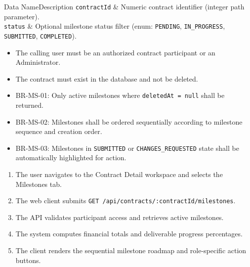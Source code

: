 
\begin{specdatatable}{Data Name}{Description}
      \texttt{contractId} & Numeric contract identifier (integer path parameter).\\ \hline
      \texttt{status} & Optional milestone status filter (enum: \texttt{PENDING}, \texttt{IN\_PROGRESS}, \texttt{SUBMITTED}, \texttt{COMPLETED}).\\ \hline
\end{specdatatable}

\begin{itemize}[leftmargin=1.6em,topsep=3pt,itemsep=2pt,parsep=0pt,label=$\bullet$]
      \item The calling user must be an authorized contract participant or an Administrator.
      \item The contract must exist in the database and not be deleted.
\end{itemize}

\begin{itemize}[leftmargin=1.6em,topsep=3pt,itemsep=2pt,parsep=0pt,label=$\bullet$]\brrulelist
      \item BR-MS-01: Only active milestones where \texttt{deletedAt = null} shall be returned.
      \item BR-MS-02: Milestones shall be ordered sequentially according to milestone sequence and creation order.
      \item BR-MS-03: Milestones in \texttt{SUBMITTED} or \texttt{CHANGES\_REQUESTED} state shall be automatically highlighted for action.
\end{itemize}

\begin{enumerate}[leftmargin=1.8em,topsep=3pt,itemsep=2pt,parsep=0pt]
      \item The user navigates to the Contract Detail workspace and selects the Milestones tab.
      \item The web client submits \texttt{GET /api/contracts/:contractId/milestones}.
      \item The API validates participant access and retrieves active milestones.
      \item The system computes financial totals and deliverable progress percentages.
      \item The client renders the sequential milestone roadmap and role-specific action buttons.
\end{enumerate}

